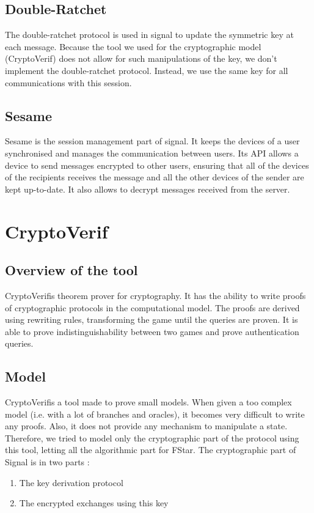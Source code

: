 \documentclass[a4paper, 10pt]{article}
\newcommand{\cv}{CryptoVerif}
\begin{document}
	\subsection{Double-Ratchet}
		The double-ratchet protocol is used in signal to update the symmetric key at each message. Because the tool we used for the cryptographic model (\cv) does not allow for such manipulations of the key, we don't implement the double-ratchet protocol. Instead, we use the same key for all communications with this session.

	\subsection{Sesame}
		Sesame is the session management part of signal. It keeps the devices of a user synchronised and manages the communication between users. Its API allows a device to send messages encrypted to other users, ensuring that all of the devices of the recipients receives the message and all the other devices of the sender are kept up-to-date. It also allows to decrypt messages received from the server.

\section{\cv}
	\subsection{Overview of the tool}
	\cv is theorem prover for cryptography. It has the ability to write proofs of cryptographic protocols in the computational model. The proofs are derived using rewriting rules, transforming the game until the queries are proven. It is able to prove indistinguishability between two games and prove authentication queries.
	\subsection{Model}
	\cv is a tool made to prove small models. When given a too complex model (i.e. with a lot of branches and oracles), it becomes very difficult to write any proofs. Also, it does not provide any mechanism to manipulate a state. Therefore, we tried to model only the cryptographic part of the protocol using this tool, letting all the algorithmic part for FStar.
	The cryptographic part of Signal is in two parts :
	\begin{enumerate}
		\item The key derivation protocol
		\item The encrypted exchanges using this key
	\end{enumerate}
	
\end{document}
